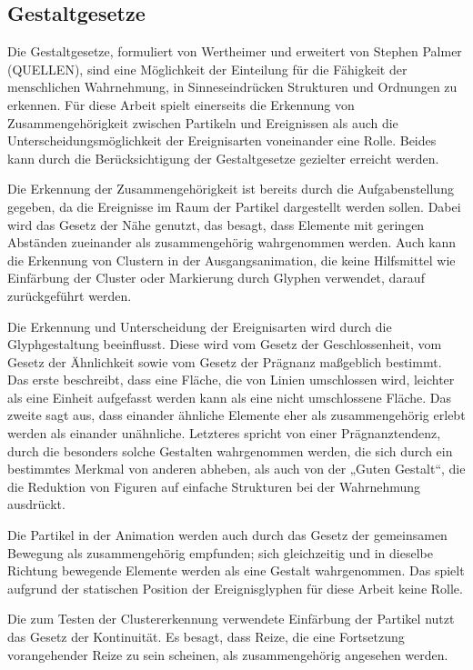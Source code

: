 \subsection{Gestaltgesetze}\label{sec:gestaltgesetze}
Die Gestaltgesetze, formuliert von Wertheimer und erweitert von Stephen Palmer (QUELLEN), sind eine Möglichkeit der Einteilung für die Fähigkeit der menschlichen Wahrnehmung, in Sinneseindrücken Strukturen und Ordnungen zu erkennen. Für diese Arbeit spielt einerseits die Erkennung von Zusammengehörigkeit zwischen Partikeln und Ereignissen als auch die Unterscheidungsmöglichkeit der Ereignisarten voneinander eine Rolle. Beides kann durch die Berücksichtigung der Gestaltgesetze gezielter erreicht werden.

Die Erkennung der Zusammengehörigkeit ist bereits durch die Aufgabenstellung gegeben, da die Ereignisse im Raum der Partikel dargestellt werden sollen. Dabei wird das Gesetz der Nähe genutzt, das besagt, dass Elemente mit geringen Abständen zueinander als zusammengehörig wahrgenommen werden. Auch kann die Erkennung von Clustern in der Ausgangsanimation, die keine Hilfsmittel wie Einfärbung der Cluster oder Markierung durch Glyphen verwendet, darauf zurückgeführt werden.

Die Erkennung und Unterscheidung der Ereignisarten wird durch die Glyphgestaltung beeinflusst. Diese wird vom Gesetz der Geschlossenheit, vom Gesetz der Ähnlichkeit sowie vom Gesetz der Prägnanz maßgeblich bestimmt. Das erste beschreibt, dass eine Fläche, die von Linien umschlossen wird, leichter als eine Einheit aufgefasst werden kann als eine nicht umschlossene Fläche. Das zweite sagt aus, dass einander ähnliche Elemente eher als zusammengehörig erlebt werden als einander unähnliche. Letzteres spricht von einer Prägnanztendenz, durch die besonders solche Gestalten wahrgenommen werden, die sich durch ein bestimmtes Merkmal von anderen abheben, als auch von der „Guten Gestalt“, die die Reduktion von Figuren auf einfache Strukturen bei der Wahrnehmung ausdrückt.

Die Partikel in der Animation werden auch durch das Gesetz der gemeinsamen Bewegung als zusammengehörig empfunden; sich gleichzeitig und in dieselbe Richtung bewegende Elemente werden als eine Gestalt wahrgenommen. Das spielt aufgrund der statischen Position der Ereignisglyphen für diese Arbeit keine Rolle.

Die zum Testen der Clustererkennung verwendete Einfärbung der Partikel nutzt das Gesetz der Kontinuität. Es besagt, dass Reize, die eine Fortsetzung vorangehender Reize zu sein scheinen, als zusammengehörig angesehen werden.

